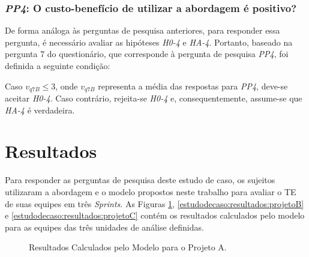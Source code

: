 \subsubsection{\textit{PP4}: O custo-benefício de utilizar a abordagem é positivo?}

De forma análoga às perguntas de pesquisa anteriores, para responder essa pergunta, é necessário avaliar as hipóteses \textit{H0-4} e \textit{HA-4}. Portanto, baseado na pergunta 7 do questionário, que corresponde à pergunta de pesquisa \textit{PP4}, foi definida a seguinte condição:

Caso $v_{q7B} \le 3$, onde $v_{q7B}$ representa a média das respostas para \textit{PP4}, deve-se aceitar \textit{H0-4}. Caso contrário, rejeita-se \textit{H0-4} e, consequentemente, assume-se que \textit{HA-4} é verdadeira.

\section{Resultados}
\label{estudodecaso:resultados}

Para responder as perguntas de pesquisa deste estudo de caso, os sujeitos utilizaram a abordagem e o modelo propostos neste trabalho para avaliar o TE de suas equipes em três \textit{Sprints}. As Figuras \ref{estudodecaso:resultados:projetoA}, \ref{estudodecaso:resultados:projetoB} e \ref{estudodecaso:resultados:projetoC} contém os resultados calculados pelo modelo para as equipes das três unidades de análise definidas. 

\begin{figure}[ht!]
\begin{center}
	\end{center}
	\caption{Resultados Calculados pelo Modelo para o Projeto A.}
	\label{estudodecaso:resultados:projetoA}
\end{figure}

